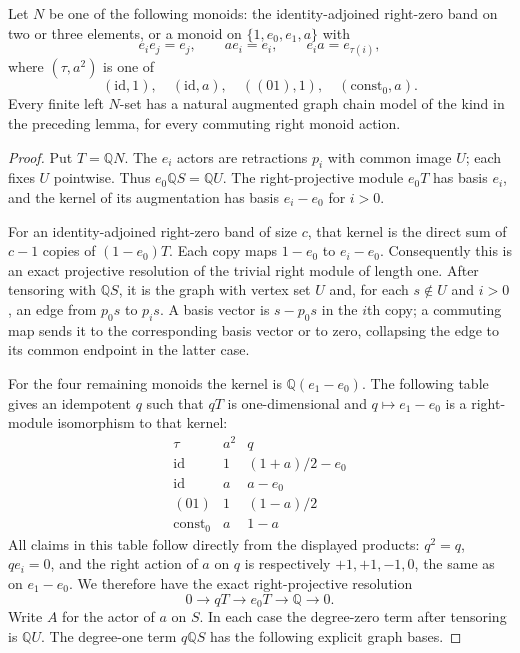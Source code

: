 \begin{lemma}
\label{CP2:A-four-corner-graph-chain}
Let $N$ be one of the following monoids:
the identity-adjoined right-zero band on two or three
elements, or a monoid on $\{1,e_0,e_1,a\}$ with
\[
 e_i e_j=e_j,\qquad ae_i=e_i,\qquad
 e_i a=e_{\tau(i)},
\]
where $(\tau,a^2)$ is one of
\[
 (\mathrm{id},1),\quad(\mathrm{id},a),\quad
 ((01),1),\quad(\mathrm{const}_0,a).
\]
Every finite left $N$-set has a natural augmented graph
chain model of the kind in the preceding lemma, for
every commuting right monoid action.
\end{lemma}
\begin{proof}
Put $T=\mathbb QN$.  The $e_i$ actors are retractions
$p_i$ with common image $U$; each fixes $U$ pointwise.
Thus $e_0\mathbb QS=\mathbb QU$.  The right-projective
module $e_0T$ has basis $e_i$, and the kernel of its
augmentation has basis $e_i-e_0$ for $i>0$.

For an identity-adjoined right-zero band of size $c$,
that kernel is the direct sum of $c-1$ copies of
$(1-e_0)T$.  Each copy maps $1-e_0$ to $e_i-e_0$.
Consequently this is an exact projective resolution of
the trivial right module of length one.  After tensoring
with $\mathbb QS$, it is the graph with vertex set $U$
and, for each $s\notin U$ and $i>0$, an edge from
$p_0s$ to $p_i s$.  A basis vector is $s-p_0s$ in
the $i$th copy; a commuting map sends it to the
corresponding basis vector or to zero, collapsing the
edge to its common endpoint in the latter case.

For the four remaining monoids the kernel is
$\mathbb Q(e_1-e_0)$.  The following table gives an
idempotent $q$ such that $qT$ is one-dimensional and
$q\mapsto e_1-e_0$ is a right-module isomorphism to
that kernel:
\[
\begin{array}{c|c|c}
\tau&a^2&q\\\hline
\mathrm{id}&1&(1+a)/2-e_0\\
\mathrm{id}&a&a-e_0\\
(01)&1&(1-a)/2\\
\mathrm{const}_0&a&1-a
\end{array}
\]
All claims in this table follow directly from the
displayed products: $q^2=q$, $qe_i=0$, and the right
action of $a$ on $q$ is respectively $+1,+1,-1,0$,
the same as on $e_1-e_0$.  We therefore have the
exact right-projective resolution
\[
 0\longrightarrow qT\longrightarrow e_0T
   \longrightarrow\mathbb Q\longrightarrow0.
\]
Write $A$ for the actor of $a$ on $S$.  In each case
the degree-zero term after tensoring is $\mathbb QU$.
The degree-one term $q\mathbb QS$ has the following
explicit graph bases.


\end{proof}
